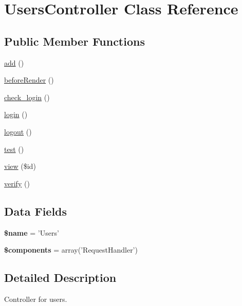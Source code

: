 \hypertarget{class_users_controller}{
\section{UsersController Class Reference}
\label{class_users_controller}
}
\subsection*{Public Member Functions}
\begin{DoxyCompactItemize}
\item 
\hyperlink{class_users_controller_a837ba24a1c3095ae67613238d866f79a}{add} ()
\item 
\hyperlink{class_users_controller_ac89dd29d2229bbc37879d31f95d06e97}{beforeRender} ()
\item 
\hyperlink{class_users_controller_a648185926782004aa207e8bdfdfe8197}{check\_\-login} ()
\item 
\hyperlink{class_users_controller_aa311da27ba5706f5710cea7706c8eae1}{login} ()
\item 
\hyperlink{class_users_controller_a082405d89acd6835c3a7c7a08a7adbab}{logout} ()
\item 
\hyperlink{class_users_controller_ad69dd4607977cae05ebe19d1ae604fb1}{test} ()
\item 
\hyperlink{class_users_controller_a93a99cdd06e6a3044ed7e56db0f9419a}{view} (\$id)
\item 
\hyperlink{class_users_controller_aa33600b6a1b28d0c4dfe4d468272aaa4}{verify} ()
\end{DoxyCompactItemize}
\subsection*{Data Fields}
\begin{DoxyCompactItemize}
\item 
\hypertarget{class_users_controller_ab2fc40d43824ea3e1ce5d86dee0d763b}{
{\bfseries \$name} = 'Users'}
\label{class_users_controller_ab2fc40d43824ea3e1ce5d86dee0d763b}

\item 
\hypertarget{class_users_controller_a2409c247baf67a1d4c6b9a1789cfc088}{
{\bfseries \$components} = array('RequestHandler')}
\label{class_users_controller_a2409c247baf67a1d4c6b9a1789cfc088}

\end{DoxyCompactItemize}


\subsection{Detailed Description}
Controller for users. 

